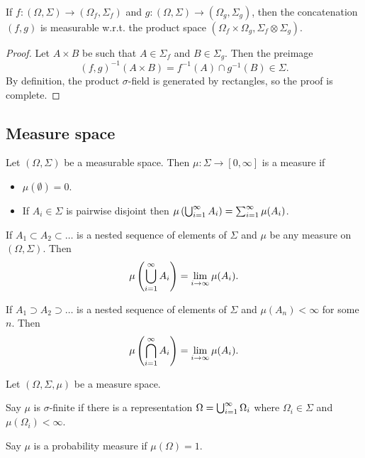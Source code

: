 \documentclass[a4paper]{article}
\begin{document}
\begin{prop}
  If $f : (\Omega, \Sigma) \to (\Omega_f, \Sigma_f)$ and
  $g : (\Omega, \Sigma) \to (\Omega_g, \Sigma_g)$, then the concatenation
  $(f, g)$ is measurable w.r.t. the product space
  $(\Omega_f \times \Omega_g, \Sigma_f \otimes \Sigma_g)$.
\end{prop}

\begin{proof}
  Let $A \times B$ be such that $A \in \Sigma_f$ and $B \in \Sigma_g$.
  Then the preimage
  \[
    (f, g)^{-1} (A \times B) = f^{-1} (A) \cap g^{-1} (B) \in \Sigma.
  \]
  By definition, the product $\sigma$-field is generated by rectangles,
  so the proof is complete.

\end{proof}

\subsection{Measure space}
\begin{defi}[measure]
  Let $(\Omega, \Sigma)$ be a measurable space. Then $\mu : \Sigma \to
    [0, \infty]$ is a measure if
  \begin{itemize}
    \item $\mu (\emptyset) = 0$.
    \item If $A_i \in \Sigma$ is pairwise disjoint then
          $\mu \left( \bigcup_{i=1}^\infty A_i \right) = \sum_{i=1}^\infty \mu (A_i)$.
  \end{itemize}
\end{defi}

\begin{prop}
  If $A_1 \subset A_2 \subset \dots$ is a nested sequence of elements
  of $\Sigma$ and $\mu$ be any measure on $(\Omega, \Sigma)$. Then
  \[
    \mu \left( \bigcup_{i=1}^\infty A_i \right) = \lim_{i \to \infty} \mu (A_i).
  \]

  If $A_1 \supset A_2 \supset \dots$ is a nested sequence of elements
  of $\Sigma$ and $\mu (A_n) < \infty$ for some $n$. Then
  \[
    \mu \left( \bigcap_{i=1}^\infty A_i \right) = \lim_{i \to \infty} \mu (A_i).
  \]
\end{prop}

\begin{defi}
  Let $(\Omega, \Sigma, \mu)$ be a measure space.

  Say $\mu$ is $\sigma$-finite
  if there is a representation $\Omega = \bigcup_{i=1}^\infty \Omega_i$ where
  $\Omega_i \in \Sigma$ and $\mu (\Omega_i) < \infty$.

  Say $\mu$ is a probability measure if $\mu(\Omega) = 1$.
\end{defi}
\end{document}
